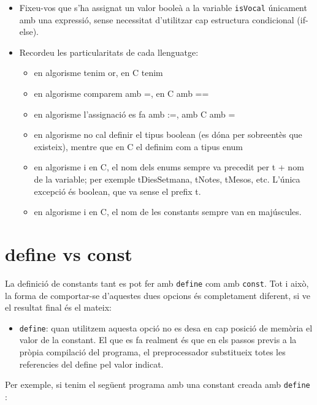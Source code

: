 \documentclass[]{book}
\providecommand{\tightlist}{%
  \setlength{\itemsep}{0pt}\setlength{\parskip}{0pt}}
\begin{document}
\begin{itemize}
\item
  Fixeu-vos que s'ha assignat un valor booleà a la variable
  \texttt{isVocal} únicament amb una expressió, sense necessitat
  d'utilitzar cap estructura condicional (if-else).
\item
  Recordeu les particularitats de cada llenguatge:

  \begin{itemize}
  \tightlist
  \item
    en algorisme tenim or, en C tenim \textbar{}\textbar{}
  \item
    en algorisme comparem amb =, en C amb ==
  \item
    en algorisme l'assignació es fa amb :=, amb C amb =
  \item
    en algorisme no cal definir el tipus boolean (es dóna per sobreentès
    que existeix), mentre que en C el definim com a tipus enum
  \item
    en algorisme i en C, el nom dels enums sempre va precedit per t +
    nom de la variable; per exemple tDiesSetmana, tNotes, tMesos, etc.
    L'única excepció és boolean, que va sense el prefix t.
  \item
    en algorisme i en C, el nom de les constants sempre van en
    majúscules.
  \end{itemize}
\end{itemize}

\section{define vs const}\label{define-vs-const}

La definició de constants tant es pot fer amb \texttt{define} com amb
\texttt{const}. Tot i això, la forma de comportar-se d'aquestes dues
opcions és completament diferent, si ve el resultat final és el mateix:

\begin{itemize}
\tightlist
\item
  \texttt{define}: quan utilitzem aquesta opció no es desa en cap
  posició de memòria el valor de la constant. El que es fa realment és
  que en els passos previs a la pròpia compilació del programa, el
  preprocessador substitueix totes les referencies del define pel valor
  indicat.
\end{itemize}

Per exemple, si tenim el següent programa amb una constant creada amb
\texttt{define} :
\end{document}
